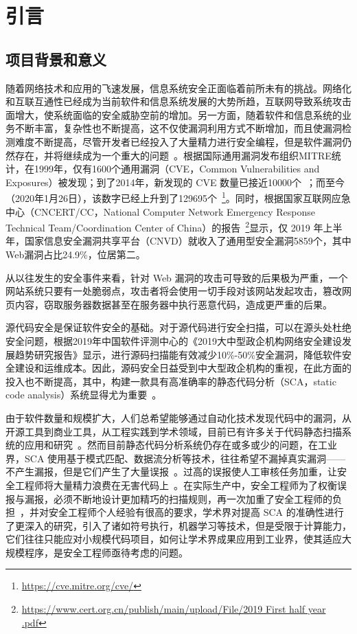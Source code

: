 \chapter{引言}

\section{项目背景和意义}
随着网络技术和应用的飞速发展，信息系统安全正面临着前所未有的挑战。网络化和互联互通性已经成为当前软件和信息系统发展的大势所趋，互联网导致系统攻击面增大，使系统面临的安全威胁空前的增加。另一方面，随着软件和信息系统的业务不断丰富，复杂性也不断提高，这不仅使漏洞利用方式不断增加，而且使漏洞检测难度不断提高，尽管开发者已经投入了大量精力进行安全编程，但是软件漏洞仍然存在，并将继续成为一个重大的问题~\cite{vuldeepecker}。根据国际通用漏洞发布组织MITRE统计，在1999年，仅有1600个通用漏洞（CVE，Common Vulnerabilities and Exposures）被发现；到了2014年，新发现的 CVE 数量已接近10000个~\cite{liujian2018}；而至今（2020年1月26日），该数字已经上升到了129695个~\footnote{\url{https://cve.mitre.org/cve/}}。同时，根据国家互联网应急中心（CNCERT/CC，National Computer Network Emergency Response Technical Team/Coordination Center of China）的报告~\footnote{\url{https://www.cert.org.cn/publish/main/upload/File/2019 First half year .pdf}}显示，仅 2019 年上半年，国家信息安全漏洞共享平台（CNVD）就收入了通用型安全漏洞5859个，其中Web漏洞占比24.9\%，位居第二。

从以往发生的安全事件来看，针对 Web 漏洞的攻击可导致的后果极为严重，一个网站系统只要有一处脆弱点，攻击者将会使用一切手段对该网站发起攻击，篡改网页内容，窃取服务器数据甚至在服务器中执行恶意代码，造成更严重的后果。

源代码安全是保证软件安全的基础。对于源代码进行安全扫描，可以在源头处杜绝安全问题，根据2019年中国软件评测中心的《2019大中型政企机构网络安全建设发展趋势研究报告》显示，进行源码扫描能有效减少10\%-50\%安全漏洞，降低软件安全建设和运维成本。因此，源码安全日益受到中大型政企机构的重视，在此方面的投入也不断提高，其中，构建一款具有高准确率的静态代码分析（SCA，static code analysis）系统显得尤为重要~\cite{aletheia}。

由于软件数量和规模扩大，人们总希望能够通过自动化技术发现代码中的漏洞，从开源工具到商业工具，从工程实践到学术领域，目前已有许多关于代码静态扫描系统的应用和研究~\cite{li2016vulpecker,leopard,sym:exe,taint:finding,vuldeepecker,taint:taj,Koc2019,sym:cute,atp:saturn,sym:klee,atp:escjava,Koc2017,pixy,aletheia}。然而目前静态代码分析系统仍存在或多或少的问题，在工业界，SCA 使用基于模式匹配、数据流分析等技术，往往希望不漏掉真实漏洞——不产生漏报，但是它们产生了大量误报~\cite{falseAlarm,aletheia,falsepositive}。过高的误报使人工审核任务加重，让安全工程师将大量精力浪费在无害代码上~\cite{leopard}。在实际生产中，安全工程师为了权衡误报与漏报，必须不断地设计更加精巧的扫描规则，再一次加重了安全工程师的负担~\cite{taintStyle,vuldeepecker}，并对安全工程师个人经验有很高的要求，学术界对提高 SCA 的准确性进行了更深入的研究，引入了诸如符号执行，机器学习等技术，但是受限于计算能力，它们往往只能应对小规模代码项目，如何让学术界成果应用到工业界，使其适应大规模程序，是安全工程师亟待考虑的问题。

